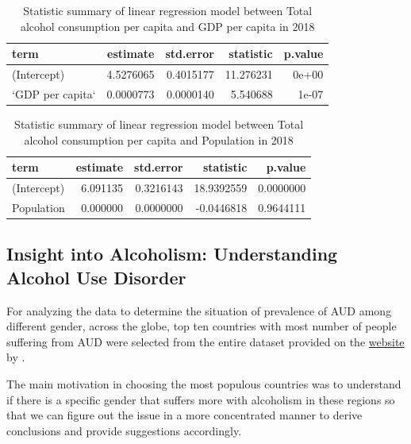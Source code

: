\documentclass[11pt,a4paper,]{article}
\begin{document}
\begin{table}

\caption{\label{tab:lm-gdp-cons}Statistic summary of linear regression model between Total alcohol consumption per capita and GDP per capita in 2018}
\centering
\begin{tabular}[t]{l|r|r|r|r}
\hline
term & estimate & std.error & statistic & p.value\\
\hline
(Intercept) & 4.5276065 & 0.4015177 & 11.276231 & 0e+00\\
\hline
`GDP per capita` & 0.0000773 & 0.0000140 & 5.540688 & 1e-07\\
\hline
\end{tabular}
\end{table}
\begin{table}

\caption{\label{tab:lm-pop-cons}Statistic summary of linear regression model between Total alcohol consumption per capita and Population in 2018}
\centering
\begin{tabular}[t]{l|r|r|r|r}
\hline
term & estimate & std.error & statistic & p.value\\
\hline
(Intercept) & 6.091135 & 0.3216143 & 18.9392559 & 0.0000000\\
\hline
Population & 0.000000 & 0.0000000 & -0.0446818 & 0.9644111\\
\hline
\end{tabular}
\end{table}

\subsection{Insight into Alcoholism: Understanding Alcohol Use Disorder}\label{insight-into-alcoholism-understanding-alcohol-use-disorder}

For analyzing the data to determine the situation of prevalence of AUD among different gender, across the globe, top ten countries with most number of people suffering from AUD were selected from the entire dataset provided on the \href{https://ourworldindata.org/alcohol-consumption\#alcoholism-and-alcohol-use-disorders}{website} by \textcite{owidalcoholconsumption}.

The main motivation in choosing the most populous countries was to understand if there is a specific gender that suffers more with alcoholism in these regions so that we can figure out the issue in a more concentrated manner to derive conclusions and provide suggestions accordingly.
\end{document}
